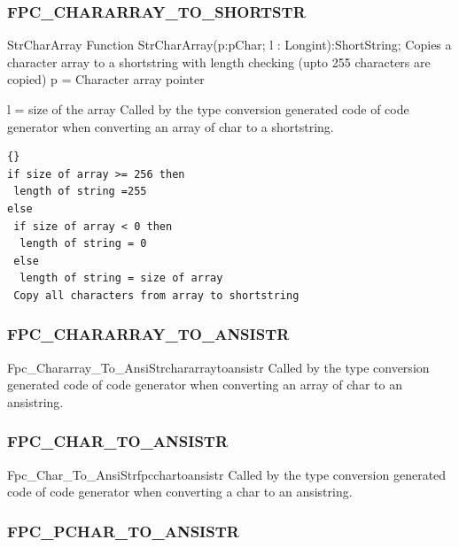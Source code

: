 \documentclass [a4paper,12pt]{article}
\begin{document}
\subsubsection{FPC{\_}CHARARRAY{\_}TO{\_}SHORTSTR}
\label{subsubsec:mylabel47}

\begin{function}{StrCharArray}
\Declaration
Function StrCharArray(p:pChar; l : Longint):ShortString;
\Description
Copies a character array to a shortstring with length checking (upto 255
characters are copied)
\Parameters
p = Character array pointer \par
l = size of the array
\Notes
Called by the type conversion generated code of code generator when
converting an array of char to a shortstring.
\Algorithm
\begin{lstlisting}{}
if size of array >= 256 then 
 length of string =255
else
 if size of array < 0 then
  length of string = 0
 else
  length of string = size of array
 Copy all characters from array to shortstring
\end{lstlisting}
\end{function}

\subsubsection{FPC{\_}CHARARRAY{\_}TO{\_}ANSISTR}
\label{subsubsec:mylabel48}

\begin{functionl}{Fpc{\_}Chararray{\_}To{\_}AnsiStr}{chararraytoansistr}
\Notes
Called by the type conversion generated code of code generator when converting an array of char to an ansistring.
\end{functionl}

\subsubsection{FPC{\_}CHAR{\_}TO{\_}ANSISTR}
\label{subsubsec:mylabel49}

\begin{functionl}{Fpc{\_}Char{\_}To{\_}AnsiStr}{fpcchartoansistr}
\Notes
Called by the type conversion generated code of code generator when
converting a char to an ansistring.
\end{functionl}

\subsubsection{FPC{\_}PCHAR{\_}TO{\_}ANSISTR}
\label{subsubsec:mylabel50}
\end{document}
